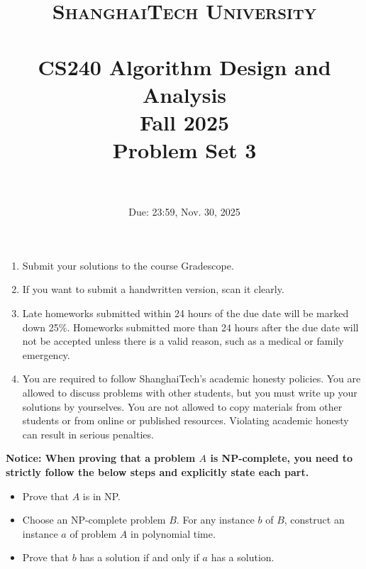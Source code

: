 \documentclass{article}
\title{
    \normalfont \normalsize
    \textsc{ShanghaiTech University} \\ [25pt]
    \horrule{0.5pt} \\[0.4cm] %
    \huge CS240 Algorithm Design and Analysis \\ %
    \LARGE Fall 2025\\
    \LARGE Problem Set 3\\
    \horrule{2pt} \\[0.5cm] %
}
\author{}
\date{Due: 23:59, Nov. 30, 2025}
\begin{document}
\maketitle
\vspace{3ex}

\begin{enumerate}
\item Submit your solutions to the course Gradescope.
\item If you want to submit a handwritten version, scan it clearly.
\item Late homeworks submitted within 24 hours of the due date will be marked down 25\%. Homeworks submitted more than 24 hours after the due date will not be accepted unless there is a valid reason, such as a medical or family emergency.  
\item You are required to follow ShanghaiTech's academic honesty policies. You are allowed to discuss problems with other students, but you must write up your solutions by yourselves. You are not allowed to copy materials from other students or from online or published resources. Violating academic honesty can result in serious penalties.  
\end{enumerate}

\newpage
\textbf{Notice: When proving that a problem \( A \) is NP-complete, you need to strictly follow the below steps and explicitly state each part.}

\begin{itemize}
    \item Prove that \( A \) is in NP.
    \item Choose an NP-complete problem \( B \). For any instance \( b \) of \( B \), construct an instance \( a \) of problem \( A \) in polynomial time.
    \item Prove that \( b \) has a solution if and only if \( a \) has a solution.
\end{itemize}

\newpage


% 

% 

% 

% 
\end{document}
